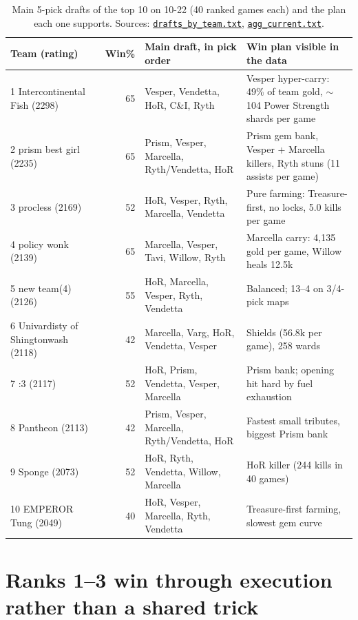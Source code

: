 \documentclass[11pt,a4paper]{article}
\newcommand{\scratch}{file:///private/tmp/claude-501/-Users-tristanbasri-Desktop-Code-cambridge-battlecode-s2/b3f4cb6b-e46a-405f-957c-42c44c05c8dc/scratchpad/ladder-data}
\newcommand{\CI}{C\&I}
\begin{document}
\begin{table}[H]
\centering\small
\caption{Main 5-pick drafts of the top 10 on 10-22 (40 ranked games each) and the plan each one supports. Sources: \href{\scratch/top1-10/drafts_by_team.txt}{\texttt{drafts\_by\_team.txt}}, \href{\scratch/top1-10/agg_current.txt}{\texttt{agg\_current.txt}}.}
\begin{tabularx}{\linewidth}{@{}l r X X@{}}
\toprule
Team (rating) & Win\% & Main draft, in pick order & Win plan visible in the data\\
\midrule
1 Intercontinental Fish (2298) & 65 & Vesper, Vendetta, HoR, \CI, Ryth & Vesper hyper-carry: 49\% of team gold, ${\sim}$104 Power Strength shards per game\\
2 prism best girl (2235) & 65 & Prism, Vesper, Marcella, Ryth/Vendetta, HoR & Prism gem bank, Vesper + Marcella killers, Ryth stuns (11 assists per game)\\
3 procless (2169) & 52 & HoR, Vesper, Ryth, Marcella, Vendetta & Pure farming: Treasure-first, no locks, 5.0 kills per game\\
4 policy wonk (2139) & 65 & Marcella, Vesper, Tavi, Willow, Ryth & Marcella carry: 4,135 gold per game, Willow heals 12.5k\\
5 new team(4) (2126) & 55 & HoR, Marcella, Vesper, Ryth, Vendetta & Balanced; 13--4 on 3/4-pick maps\\
6 Univardisty of Shingtonwash (2118) & 42 & Marcella, Varg, HoR, Vendetta, Vesper & Shields (56.8k per game), 258 wards\\
7 :3 (2117) & 52 & HoR, Prism, Vendetta, Vesper, Marcella & Prism bank; opening hit hard by fuel exhaustion\\
8 Pantheon (2113) & 42 & Prism, Vesper, Marcella, Ryth/Vendetta, HoR & Fastest small tributes, biggest Prism bank\\
9 Sponge (2073) & 52 & HoR, Ryth, Vendetta, Willow, Marcella & HoR killer (244 kills in 40 games)\\
10 EMPEROR Tung (2049) & 40 & HoR, Vesper, Marcella, Ryth, Vendetta & Treasure-first farming, slowest gem curve\\
\bottomrule
\end{tabularx}
\label{tab:drafts}
\end{table}

\section{Ranks 1--3 win through execution rather than a shared trick}
\end{document}
